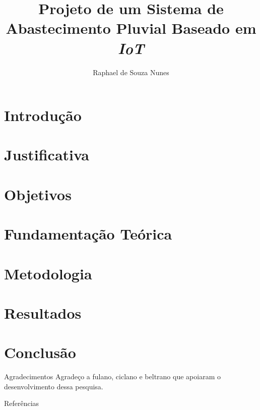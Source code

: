 \documentclass[11pt]{beamer}
\title[Trabalho de Conclusão de Curso]{Projeto de um Sistema de Abastecimento Pluvial Baseado em \textit{IoT}}
\author[Nunes, de S. R.]{Raphael de Souza Nunes}
\begin{document}


\section{Introdução} 


\section{Justificativa}


\section{Objetivos}


\section{Fundamentação Teórica}


\section{Metodologia}


\section{Resultados}


\section{Conclusão}


\begin{frame}{Agradecimentos}
    \large{Agradeço a fulano, ciclano e beltrano que apoiaram o desenvolvimento dessa pesquisa.}
\end{frame}


\begin{frame}[allowframebreaks]{Referências}


\end{frame}


\begin{frame}
\titlepage 
\end{frame}
\end{document}
